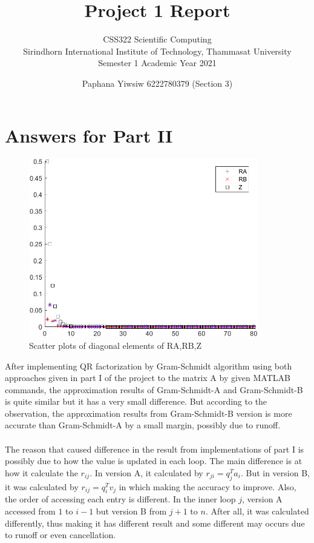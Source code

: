 \documentclass[a4paper]{article}
\title{Project 1 Report}
\subtitle{CSS322 Scientific Computing\\Sirindhorn International Institute of Technology, Thammasat University\\Semester 1 Academic Year 2021}
\author{Paphana Yiwsiw 6222780379 (Section 3)}
\begin{document}
\maketitle
\tableofcontents
 
\section*{Answers for Part II}
\begin{figure}[h]
    \centering
    \includegraphics[width=10cm]{Part2_ScatterPlot.png}
    \caption{Scatter plots of diagonal elements of RA,RB,Z}
\end{figure}
After implementing QR factorization by Gram-Schmidt algorithm using both approaches given in part I of the project to the matrix A by given MATLAB commands, the approximation results of Gram-Schmidt-A and Gram-Schmidt-B is quite similar but it has a very small difference. But according to the observation, the approximation results from Gram-Schmidt-B version is more accurate than Gram-Schmidt-A by a small margin, possibly due to runoff.
\paragraph{}
The reason that caused difference in the result from implementations of part I is possibly due to how the value is updated in each loop. The main difference is at how it calculate the $r_{ij}$. In version A, it calculated by $r_{ji} = q_j^Ta_i$. But in version B, it was calculated by $r_{ij} = q_i^Tv_j$ in which making the accuracy to improve. Also, the order of accessing each entry is different. In the inner loop $j$, version A accessed from $1$ to $i-1$ but version B from $j+1$ to $n$. After all, it was calculated differently, thus making it has different result and some different may occurs due to runoff or even cancellation. 
 
\end{document}
